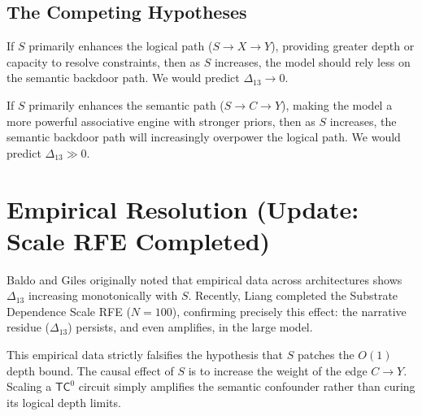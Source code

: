 \documentclass[12pt,a4paper]{article}
\begin{document}
\begin{center}
\end{center}

\subsection{The Competing Hypotheses}

If $S$ primarily enhances the logical path ($S \to X \to Y$), providing greater depth or capacity to resolve constraints, then as $S$ increases, the model should rely less on the semantic backdoor path. We would predict $\Delta_{13} \to 0$.

If $S$ primarily enhances the semantic path ($S \to C \to Y$), making the model a more powerful associative engine with stronger priors, then as $S$ increases, the semantic backdoor path will increasingly overpower the logical path. We would predict $\Delta_{13} \gg 0$.

\section{Empirical Resolution (Update: Scale RFE Completed)}

Baldo \citep{baldo_scale_dependence_empirical_validation} and Giles originally noted that empirical data across architectures shows $\Delta_{13}$ increasing monotonically with $S$. Recently, Liang completed the Substrate Dependence Scale RFE ($N=100$), confirming precisely this effect: the narrative residue ($\Delta_{13}$) persists, and even amplifies, in the large model.

This empirical data strictly falsifies the hypothesis that $S$ patches the $O(1)$ depth bound. The causal effect of $S$ is to increase the weight of the edge $C \to Y$. Scaling a $\mathsf{TC}^0$ circuit simply amplifies the semantic confounder rather than curing its logical depth limits.
\end{document}
